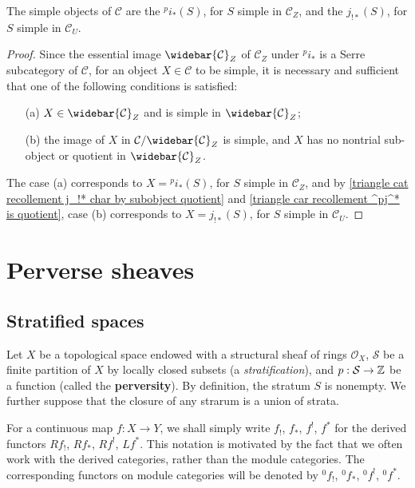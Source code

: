 \begin{proposition}\label{triangle cat recollement simple object of heart char}
The simple objects of $\mathcal{C}$ are the ${^pi_*}(S)$, for $S$ simple in $\mathcal{C}_Z$, and the $j_{!*}(S)$, for $S$ simple in $\mathcal{C}_U$.
\end{proposition}
\begin{proof}
Since the essential image $\widebar{\mathcal{C}}_Z$ of $\mathcal{C}_Z$ under ${^pi_*}$ is a Serre subcategory of $\mathcal{C}$, for an object $X\in\mathcal{C}$ to be simple, it is necessary and sufficient that one of the following conditions is satisfied:
\begin{enumerate}
    \item[(a)] $X\in\widebar{\mathcal{C}}_Z$ and is simple in $\widebar{\mathcal{C}}_Z$;
    \item[(b)] the image of $X$ in $\mathcal{C}/\widebar{\mathcal{C}}_Z$ is simple, and $X$ has no nontrial sub-object or quotient in $\widebar{\mathcal{C}}_Z$.
\end{enumerate}
The case (a) corresponds to $X={^pi_*}(S)$, for $S$ simple in $\mathcal{C}_Z$, and by \cref{triangle cat recollement j_!* char by subobject quotient} and \cref{triangle car recollement ^pj^* is quotient}, case (b) corresponds to $X=j_{!*}(S)$, for $S$ simple in $\mathcal{C}_U$.
\end{proof}

\section{Perverse sheaves}
\subsection{Stratified spaces}
Let $X$ be a topological space endowed with a structural sheaf of rings $\mathscr{O}_X$, $\mathcal{S}$ be a finite partition of $X$ by locally closed subsets (a \textit{stratification}), and $p:\mathcal{S}\to\mathbb{Z}$ be a function (called the \textbf{perversity}). By definition, the stratum $S$ is nonempty. We further suppose that the closure of any strarum is a union of strata.\par
For a continuous map $f:X\to Y$, we shall simply write $f_!$, $f_*$, $f^!$, $f^*$ for the derived functors $Rf_!$, $Rf_*$, $Rf^!$, $Lf^*$. This notation is motivated by the fact that we often work with the derived categories, rather than the module categories. The corresponding functors on module categories will be denoted by ${^0f_!}$, ${^0f_*}$, ${^0f^!}$, ${^0f^*}$.


